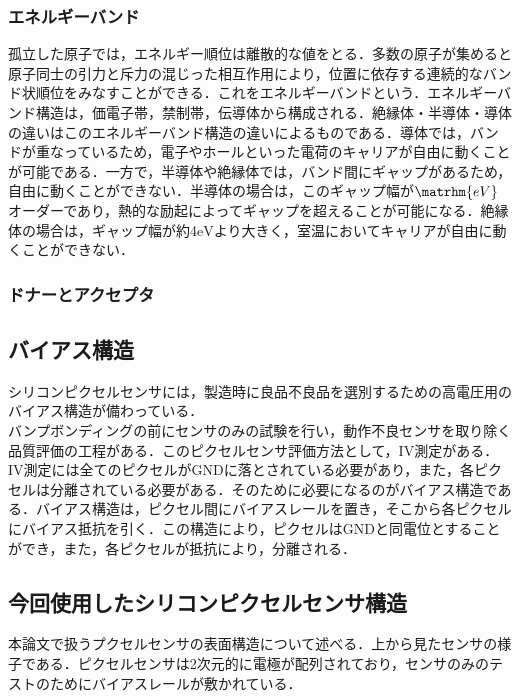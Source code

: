 \subsubsection*{エネルギーバンド}
孤立した原子では，エネルギー順位は離散的な値をとる．多数の原子が集めると原子同士の引力と斥力の混じった相互作用により，位置に依存する連続的なバンド状順位をみなすことができる．これをエネルギーバンドという．エネルギーバンド構造は，価電子帯，禁制帯，伝導体から構成される．絶縁体・半導体・導体の違いはこのエネルギーバンド構造の違いによるものである．導体では，バンドが重なっているため，電子やホールといった電荷のキャリアが自由に動くことが可能である．一方で，半導体や絶縁体では，バンド間にギャップがあるため，自由に動くことができない．半導体の場合は，このギャップ幅が$\matrhm{eV}$オーダーであり，熱的な励起によってギャップを超えることが可能になる．絶縁体の場合は，ギャップ幅が約4$\mathrm{eV}$より大きく，室温においてキャリアが自由に動くことができない．

\subsubsection*{ドナーとアクセプタ}


\subsection{バイアス構造}
シリコンピクセルセンサには，製造時に良品不良品を選別するための高電圧用のバイアス構造が備わっている．\\
バンプボンディングの前にセンサのみの試験を行い，動作不良センサを取り除く品質評価の工程がある．このピクセルセンサ評価方法として，IV測定がある．IV測定には全てのピクセルがGNDに落とされている必要があり，また，各ピクセルは分離されている必要がある．そのために必要になるのがバイアス構造である．バイアス構造は，ピクセル間にバイアスレールを置き，そこから各ピクセルにバイアス抵抗を引く．この構造により，ピクセルはGNDと同電位とすることができ，また，各ピクセルが抵抗により，分離される．

\subsection{今回使用したシリコンピクセルセンサ構造}
本論文で扱うプクセルセンサの表面構造について述べる．上から見たセンサの様子である．ピクセルセンサは2次元的に電極が配列されており，センサのみのテストのためにバイアスレールが敷かれている．

